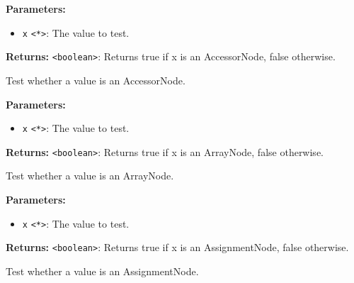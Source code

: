 \documentclass[12pt,a4paper]{article}
\begin{document}
\vspace{5mm}
\noindent {}


\noindent \textbf{Parameters:}
\begin{itemize}
  \item \texttt{x} \texttt{<*>}: The value to test.
\end{itemize}

\noindent \textbf{Returns:} \texttt{<boolean>}: Returns true if \textasciigrave{}x\textasciigrave{} is an AccessorNode, false otherwise.

\noindent Test whether a value is an AccessorNode.

\vspace{5mm}
\noindent {}


\noindent \textbf{Parameters:}
\begin{itemize}
  \item \texttt{x} \texttt{<*>}: The value to test.
\end{itemize}

\noindent \textbf{Returns:} \texttt{<boolean>}: Returns true if \textasciigrave{}x\textasciigrave{} is an ArrayNode, false otherwise.

\noindent Test whether a value is an ArrayNode.

\vspace{5mm}
\noindent {}


\noindent \textbf{Parameters:}
\begin{itemize}
  \item \texttt{x} \texttt{<*>}: The value to test.
\end{itemize}

\noindent \textbf{Returns:} \texttt{<boolean>}: Returns true if \textasciigrave{}x\textasciigrave{} is an AssignmentNode, false otherwise.

\noindent Test whether a value is an AssignmentNode.

\vspace{5mm}
\noindent {}
\end{document}
